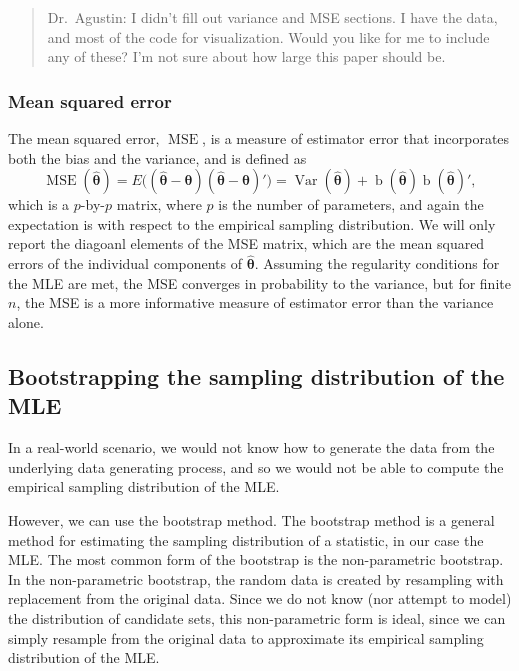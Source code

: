 \documentclass[
]{article}
\begin{document}
\begin{quote}
Dr.~Agustin: I didn't fill out variance and MSE sections. I have the
data, and most of the code for visualization. Would you like for me to
include any of these? I'm not sure about how large this paper should be.
\end{quote}

\hypertarget{mean-squared-error}{%
\subsubsection{Mean squared error}\label{mean-squared-error}}

The mean squared error, \(\operatorname{MSE}\), is a measure of
estimator error that incorporates both the bias and the variance, and is
defined as \[
\operatorname{MSE}(\boldsymbol{\hat\theta}) =
    E\bigl((\boldsymbol{\hat\theta} - \boldsymbol{\theta})(\boldsymbol{\hat\theta} - \boldsymbol{\theta})'\bigr) =
    \operatorname{Var}(\boldsymbol{\hat\theta}) +
    \operatorname{b}(\boldsymbol{\hat\theta})\operatorname{b}(\boldsymbol{\hat\theta})',
\] which is a \(p\)-by-\(p\) matrix, where \(p\) is the number of
parameters, and again the expectation is with respect to the empirical
sampling distribution. We will only report the diagoanl elements of the
MSE matrix, which are the mean squared errors of the individual
components of \(\boldsymbol{\hat\theta}\). Assuming the regularity
conditions for the MLE are met, the MSE converges in probability to the
variance, but for finite \(n\), the MSE is a more informative measure of
estimator error than the variance alone.

\hypertarget{sec:boot}{%
\subsection{Bootstrapping the sampling distribution of the
MLE}\label{sec:boot}}

In a real-world scenario, we would not know how to generate the data
from the underlying data generating process, and so we would not be able
to compute the empirical sampling distribution of the MLE.

However, we can use the bootstrap method. The bootstrap method is a
general method for estimating the sampling distribution of a statistic,
in our case the MLE. The most common form of the bootstrap is the
non-parametric bootstrap. In the non-parametric bootstrap, the random
data is created by resampling with replacement from the original data.
Since we do not know (nor attempt to model) the distribution of
candidate sets, this non-parametric form is ideal, since we can simply
resample from the original data to approximate its empirical sampling
distribution of the MLE.
\end{document}
